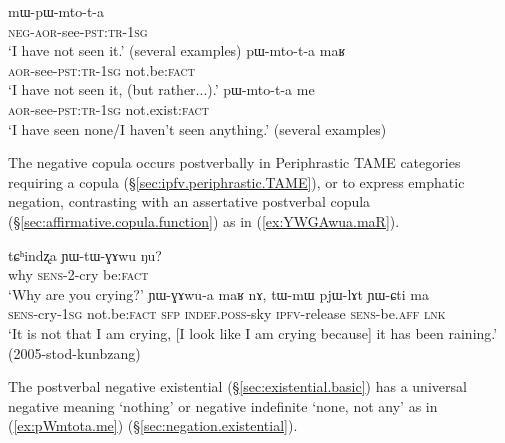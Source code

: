 \begin{exe}
	\ex  \label{ex:negation.3}
	\begin{xlist}
		\ex \label{ex:mWpWmtota}
		\gll mɯ-pɯ-mto-t-a \\
		\textsc{neg}-\textsc{aor}-see-\textsc{pst}:\textsc{tr}-\textsc{1sg} \\
		\glt `I have not seen it.' (several examples)
		\ex \label{ex:pWmtota.maR}
		\gll pɯ-mto-t-a maʁ\\
		\textsc{aor}-see-\textsc{pst}:\textsc{tr}-\textsc{1sg} not.be:\textsc{fact} \\
		\glt `I have not seen it, (but rather...).' 
		\ex \label{ex:pWmtota.me}
		\gll pɯ-mto-t-a me \\
		\textsc{aor}-see-\textsc{pst}:\textsc{tr}-\textsc{1sg} not.exist:\textsc{fact} \\
		\glt `I have seen none/I haven't seen anything.' (several examples)
	\end{xlist}
\end{exe}

The negative copula  occurs postverbally in Periphrastic TAME categories requiring a copula (§\ref{sec:ipfv.periphrastic.TAME}), or to express emphatic negation, contrasting with an assertative postverbal copula (§\ref{sec:affirmative.copula.function}) as in (\ref{ex:YWGAwua.maR}).

\begin{exe}
	\ex 
	\begin{xlist}
		\ex \label{ex:tChindzxa.YWtWGAwu}
		\gll tɕʰindʐa ɲɯ-tɯ-ɣɤwu ŋu? \\
		why \textsc{sens}-2-cry be:\textsc{fact} \\
		\glt `Why are you crying?' 
		\ex \label{ex:YWGAwua.maR}
		\gll ɲɯ-ɣɤwu-a maʁ nɤ, tɯ-mɯ pjɯ-lɤt ɲɯ-ɕti ma \\
		\textsc{sens}-cry-\textsc{1sg} not.be:\textsc{fact} \textsc{sfp} \textsc{indef}.\textsc{poss}-sky \textsc{ipfv}-release \textsc{sens}-be.\textsc{aff} \textsc{lnk} \\
		\glt `It is not that I am crying, [I look like I am crying because] it has been raining.' (2005-stod-kunbzang)
	\end{xlist}
\end{exe}

The postverbal negative existential   (§\ref{sec:existential.basic}) has a universal negative meaning `nothing' or negative indefinite `none, not any' as in (\ref{ex:pWmtota.me}) (§\ref{sec:negation.existential}). 

